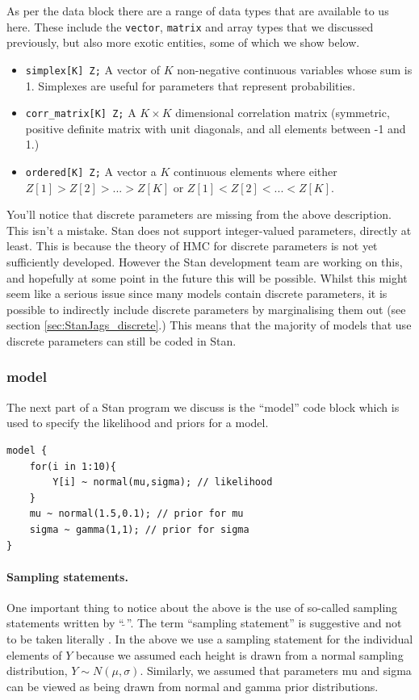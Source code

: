 \documentclass[11pt,fullpage]{book}
\begin{document}
As per the data block there are a range of data types that are available to us here. These include the \texttt{vector}, \texttt{matrix} and array types that we discussed previously, but also more exotic entities, some of which we show below.

\begin{itemize}
\item \texttt{simplex[K] Z;} A vector of $K$ non-negative continuous variables whose sum is 1. Simplexes are useful for parameters that represent probabilities.
\item \texttt{corr_matrix[K] Z;} A $K\times K$ dimensional correlation matrix (symmetric, positive definite matrix with unit diagonals, and all elements between -1 and 1.)
\item \texttt{ordered[K] Z;} A vector a $K$ continuous elements where either $Z[1] > Z[2] > ... > Z[K]$ or $Z[1] < Z[2] < ... < Z[K]$.
\end{itemize}

You'll notice that discrete parameters are missing from the above description. This isn't a mistake. Stan does not support integer-valued parameters, directly at least. This is because the theory of HMC for discrete parameters is not yet sufficiently developed. However the Stan development team are working on this, and hopefully at some point in the future this will be possible. Whilst this might seem like a serious issue since many models contain discrete parameters, it is possible to indirectly include discrete parameters by marginalising them out (see section \ref{sec:StanJags_discrete}.) This means that the majority of models that use discrete parameters can still be coded in Stan.

\subsubsection{model}\label{sec:StanJags_model}
The next part of a Stan program we discuss is the ``model'' code block which is used to specify the likelihood and priors for a model.
	\begin{verbatim}
model {
    for(i in 1:10){
        Y[i] ~ normal(mu,sigma); // likelihood
    }
    mu ~ normal(1.5,0.1); // prior for mu
    sigma ~ gamma(1,1); // prior for sigma
}
	\end{verbatim}
\paragraph{Sampling statements.} One important thing to notice about the above is the use of so-called sampling statements written by ``$\tilde{~}$''. The term ``sampling statement'' is suggestive and not to be taken literally \cite{carpenter2016stan}. In the above we use a sampling statement for the individual elements of $Y$ because we assumed each height is drawn from a normal sampling distribution, $Y\sim N(\mu,\sigma)$. Similarly, we assumed that parameters mu and sigma can be viewed as being drawn from normal and gamma prior distributions.
\end{document}
